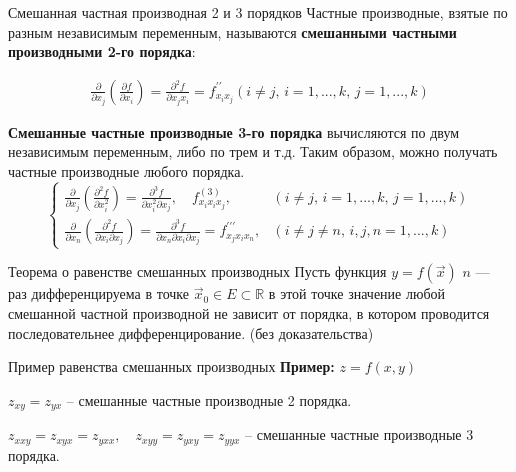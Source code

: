 \begin{tbox}{Смешанная частная производная 2 и 3 порядков}
	Частные производные, взятые по разным независимым переменным, называются \textbf{смешанными частными производными 2-го порядка}:

	\begin{align} \label{eq:2.5.4}
		\frac{\partial}{\partial x_j} \left(\frac{\partial f}{\partial x_i}\right) = \frac{\partial^2 f}{\partial x_j x_i} = f^{\prime\prime}_{x_i x_j} (i \neq j, \, i = 1,...,k, \, j = 1,...,k)
	\end{align}

	\textbf{Смешанные частные производные 3-го порядка} вычисляются по двум независимым переменным, либо по трем и т.д. Таким образом, можно получать частные производные любого порядка.
	\begin{equation}\label{eq:2.5.5}
		\begin{cases}
			\displaystyle \frac{\partial}{\partial x_j} \left( \frac{\partial^2 f}{\partial x_i^2} \right) = \frac{\partial^3 f}{\partial x_i^2 \partial x_j}, \quad f^{(3)}_{x_i x_i x_j}, \quad &(i \neq j, \, i = 1,...,k, \, j = 1,...,k) \\
			\displaystyle \frac{\partial}{\partial x_n} \left( \frac{\partial^2 f}{\partial x_i \partial x_j} \right) = \frac{\partial^3 f}{\partial x_n \partial x_i \partial x_j} = f^{\prime\prime\prime}_{x_j x_i x_n}, &(i \neq j \neq n, \, i, j, n = 1,...,k)
		\end{cases}
	\end{equation}
\end{tbox}

\begin{tbox}{Теорема о равенстве смешанных производных}
	Пусть функция \(y = f(\vec{x})\) $n$ --- раз дифференцируема в точке \(\vec{x}_0 \in E \subset \mathbb{R}\) в этой точке значение любой смешанной частной производной не зависит от порядка, в котором проводится последовательнее дифференцирование. (без доказательства)
\end{tbox}

\begin{tbox}{Пример равенства смешанных производных}
	\textbf{Пример:} $z = f(x, y)$

	\(z_{xy} = z_{yx}\) -- смешанные частные производные 2 порядка.

	\(z_{xxy} = z_{xyx} = z_{yxx}, \quad z_{xyy} = z_{yxy} = z_{yyx}\) -- смешанные частные производные 3 порядка.
\end{tbox}

